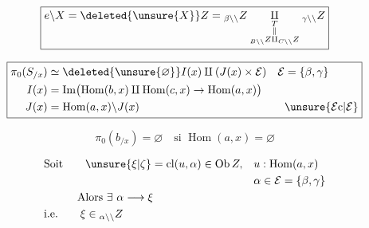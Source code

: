 
\[
 \boxed{e\backslash X=\deleted{\unsure{X}}Z
   ={}_{\beta\backslash\backslash}Z
   \underset{\substack{T\\\Vert\\{}_{B\backslash\backslash}Z\amalg{}_{C\backslash\backslash}Z}}{\amalg}
   {}_{\gamma\backslash\backslash}Z}
\]

\[
 \boxed{\begin{aligned}
 \pi_0(S_{/x})&\simeq\deleted{\unsure{\varnothing}} I(x)\amalg(J(x)\times\mathcal E)
          &\mathcal E&=\{\beta,\gamma\}\\
 I(x)&=\operatorname{Im}\bigl(\operatorname{Hom}(b,x)\amalg\operatorname{Hom}(c,x)\to\operatorname{Hom}(a,x)\bigr)\\
 J(x)&=\operatorname{Hom}(a,x)\backslash J(x) &&\unsure{\mathcal E\mathrm c|\mathcal E}
 \end{aligned}}
\]

\[
 \pi_0(b_{/x})=\varnothing\quad\text{si }\operatorname{Hom}(a,x)=\varnothing
\]

\[
 \begin{aligned}
 &\text{Soit}\qquad\unsure{\xi|\zeta}=\operatorname{cl}(u,\alpha)\in\operatorname{Ob}Z,
       &&u:\operatorname{Hom}(a,x)\\
 &&&\alpha\in\mathcal E=\{\beta,\gamma\}\\
 &\hspace{3em}\text{Alors }\exists\ \alpha\longrightarrow\xi\\
 &\text{i.e.}\qquad\xi\in{}_{\alpha\backslash\backslash}Z
 \end{aligned}
\]


